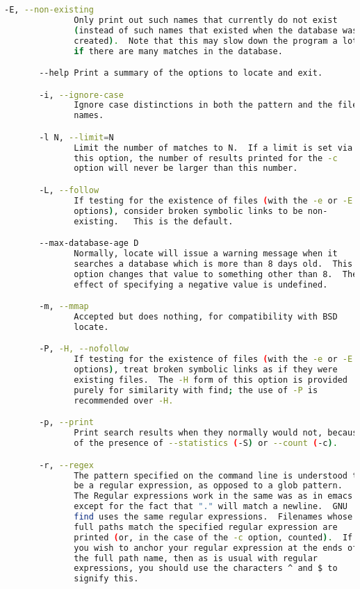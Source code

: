 {{\begin{lstlisting}[language=bash]
       -E, --non-existing
              Only print out such names that currently do not exist
              (instead of such names that existed when the database was
              created).  Note that this may slow down the program a lot,
              if there are many matches in the database.

       --help Print a summary of the options to locate and exit.

       -i, --ignore-case
              Ignore case distinctions in both the pattern and the file
              names.

       -l N, --limit=N
              Limit the number of matches to N.  If a limit is set via
              this option, the number of results printed for the -c
              option will never be larger than this number.

       -L, --follow
              If testing for the existence of files (with the -e or -E
              options), consider broken symbolic links to be non-
              existing.   This is the default.

       --max-database-age D
              Normally, locate will issue a warning message when it
              searches a database which is more than 8 days old.  This
              option changes that value to something other than 8.  The
              effect of specifying a negative value is undefined.

       -m, --mmap
              Accepted but does nothing, for compatibility with BSD
              locate.

       -P, -H, --nofollow
              If testing for the existence of files (with the -e or -E
              options), treat broken symbolic links as if they were
              existing files.  The -H form of this option is provided
              purely for similarity with find; the use of -P is
              recommended over -H.

       -p, --print
              Print search results when they normally would not, because
              of the presence of --statistics (-S) or --count (-c).

       -r, --regex
              The pattern specified on the command line is understood to
              be a regular expression, as opposed to a glob pattern.
              The Regular expressions work in the same was as in emacs
              except for the fact that "." will match a newline.  GNU
              find uses the same regular expressions.  Filenames whose
              full paths match the specified regular expression are
              printed (or, in the case of the -c option, counted).  If
              you wish to anchor your regular expression at the ends of
              the full path name, then as is usual with regular
              expressions, you should use the characters ^ and $ to
              signify this.


\end{lstlisting}}}
